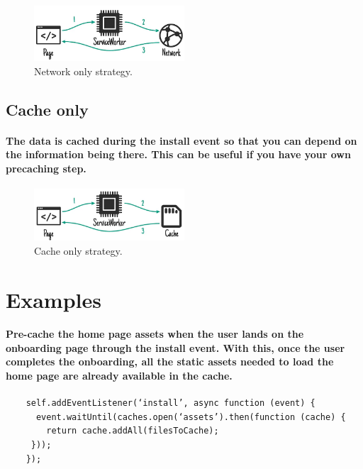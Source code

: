 \documentclass[12pt,a4paper]{article}
\begin{document}
    \begin{figure}[h!]
      \centering
      \includegraphics[width=0.5\textwidth]{networkonly.png}
      \caption{Network only strategy.}
    \end{figure}

    \subsection{Cache only}

    \paragraph{The data is cached during the install event so that you can depend on the information being there. This can be useful if you have your own precaching step.}

    \begin{figure}[h!]
      \centering
      \includegraphics[width=0.5\textwidth]{cacheonly.png}
      \caption{Cache only strategy.}
    \end{figure}

    \section{Examples}

    \paragraph{Pre-cache the home page assets when the user lands on the onboarding page through the install event. With this, once the user completes the onboarding, all the static assets needed to load the home page are already available in the cache.}

    \begin{verbatim}
    self.addEventListener(‘install’, async function (event) {
      event.waitUntil(caches.open(‘assets’).then(function (cache) {
        return cache.addAll(filesToCache);
     }));
    });
    \end{verbatim}
\end{document}
